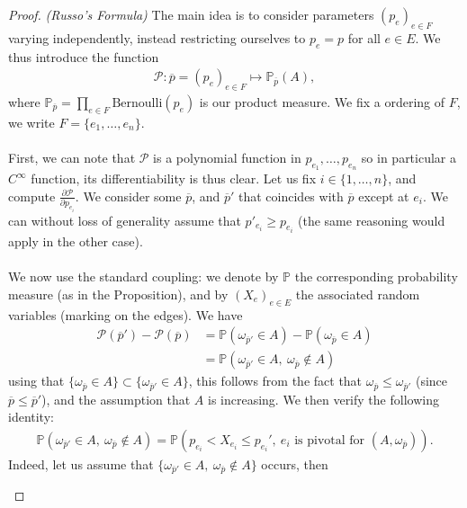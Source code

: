 \documentclass[12pt,a4paper]{article}
\theoremstyle{definition}
\begin{document}
\begin{proof} \textit{(Russo's Formula)} The main idea is to consider parameters $(p_e)_{e \in F}$ varying independently, instead restricting ourselves to $p_e =p$ for all $e \in E$. We thus introduce the function
\begin{align*}
\mathcal{P} \colon \overline{p} = (p_e)_{e \in F} \mapsto \mathbb{P}_{\overline{p}}(A),
\end{align*}
where $\mathbb{P}_{\overline{p}} = \prod_{e \in F}\text{Bernoulli}(p_e)$ is our product measure. 
We fix a ordering of $F$, we write $F= \{e_1, \dots , e_n\}$. 
\\
\\
First, we can note that $\mathcal{P}$ is a polynomial function in $p_{e_1}, \dots , p_{e_n}$ so in particular a $C^\infty$ function, its differentiability is thus clear. Let us fix $i \in \{1, \dots , n\}$, and compute $\frac{\partial \mathcal{P}}{\partial p_{e_i}}$. We consider some $\overline{p}$, and $\overline{p}'$ that coincides with $\overline{p}$ except at $e_i$. We can without loss of generality assume that $p'_{e_i} \geq p_{e_i}$ (the same reasoning would apply in the other case). 
\\\\
We now use the standard coupling: we denote by $\mathbb{P}$ the corresponding probability measure (as in the Proposition), and by $(X_e)_{e \in E}$ the associated random variables (marking on the edges). We have
\begin{align*}
\mathcal{P}(\overline{p}') - \mathcal{P}(\overline{p}) &= \mathbb{P}( \omega_{\overline{p}'} \in A ) - \mathbb{P}( \omega_{\overline{p}} \in A) \\
&= \mathbb{P}( \omega_{\overline{p}'} \in A, \ \omega_{\overline{p}} \notin A)
\end{align*}
using that $\{ \omega_{\overline{p}} \in A \} \subset \{ \omega_{\overline{p}'} \in A \}$, this follows from the fact that $\omega_{\overline{p}} \leq \omega_{\overline{p}'}$ (since $\overline{p} \leq \overline{p}'$), and the assumption that $A$ is increasing. We then verify the following identity: 
\begin{align*}
\mathbb{P}( \omega_{\overline{p}'} \in A, \ \omega_{\overline{p}} \notin A) = \mathbb{P}( p_{e_i} < X_{e_i} \leq p_{e_i}', \ e_i \text{ is pivotal for } (A, \omega_{\overline{p}})). 
\end{align*}
Indeed, let us assume that $\{\omega_{\overline{p}'} \in A, \ \omega_{\overline{p}} \notin A\}$ occurs, then  
\begin{enumerate}

\end{enumerate}
\end{proof}
\end{document}
